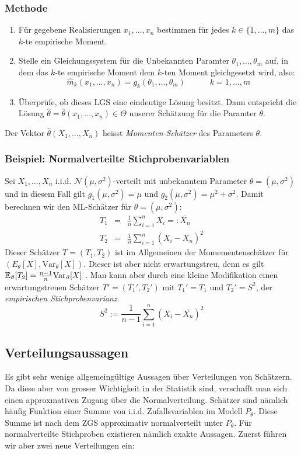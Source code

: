 \subsubsection*{Methode}
\begin{enumerate}
\item Für gegebene Realisierungen $x_1,\dots,x_n$ bestimmen für jedes $k\in\{1,\dots,m\}$ das $k$-te empirische Moment.
\item Stelle ein Gleichungssystem für die Unbekannten Paramter $\theta_1, \dots, \theta_m$ auf, in dem das $k$-te empirische Moment dem $k$-ten Moment gleichgesetzt wird, also:
$$ \widehat{m}_k(x_1,\dots,x_n) = g_k(\theta_1, \dots, \theta_m)\quad \quad \quad k=1,\dots, m$$
\item Überprüfe, ob dieses LGS eine eindeutige Lösung besitzt. Dann entspricht die Lösung $\widehat{\theta}=\widehat{\theta}(x_1,\dots,x_n) \in \Theta$ unserer Schätzung für die Paramter $\theta$.
\end{enumerate}
\begin{definition}
Der Vektor $\widehat{\theta}(X_1,\dots,X_n)$ heisst \textit{Momenten-Schätzer} des Parameters $\theta$.
\end{definition}
\subsubsection*{Beispiel: Normalverteilte Stichprobenvariablen}
Sei $X_1, \dots, X_n$ i.i.d. $\mathcal{N}(\mu, \sigma^2)$-verteilt mit unbekanntem Parameter $\theta = (\mu, \sigma^2)$ und in diesem Fall gilt $g_1(\mu, \sigma^2) = \mu$ und $g_2(\mu, \sigma^2) = \mu^2 + \sigma^2$. Damit berechnen wir den ML-Schätzer für $\theta = (\mu, \sigma^2)$:
\begin{eqnarray*}
T_1 & = & \frac{1}{n}\sum_{i=1}^n X_i =: \overline{X_n} \\
T_2 & = & \frac{1}{n}\sum_{i=1}^n (X_i - \overline{X_n})^2 
\end{eqnarray*}
Dieser Schätzer $T=(T_1,T_2)$ ist im Allgemeinen der Momementenschätzer für  $(E_\theta[X], \mathrm{Var}_\theta [X])$. Dieser ist aber nicht erwartungstreu, denn es gilt $\mathbb{E}_\vartheta[T_2] = \frac{n-1}{n} \mathrm{Var}_\vartheta[X]$ . Man kann aber durch eine kleine Modifikation einen erwartungstreuen Schätzer $T' = (T_1', T_2')$ mit $T_1' = T_1$ und $T_2' = S^2$, der \textit{empirischen Stichprobenvarianz}.
$$ S^2 := \frac{1}{n-1} \sum_{i=1}^n (X_i - \overline{X_n})^2 $$

\subsection{Verteilungsaussagen}
Es gibt sehr wenige allgemeingültige Aussagen über Verteilungen von Schätzern. Da diese aber von grosser Wichtigkeit in der Statistik sind, verschafft man sich einen approxmativen Zugang über die Normalverteilung. Schätzer sind nämlich häufig Funktion einer Summe von i.i.d. Zufallsvariablen im Modell $P_\theta$. Diese Summe ist nach dem ZGS approximativ normalverteilt unter $P_\theta$. Für normalverteilte Stichproben existieren nämlich exakte Aussagen. Zuerst führen wir aber zwei neue Verteilungen ein:

